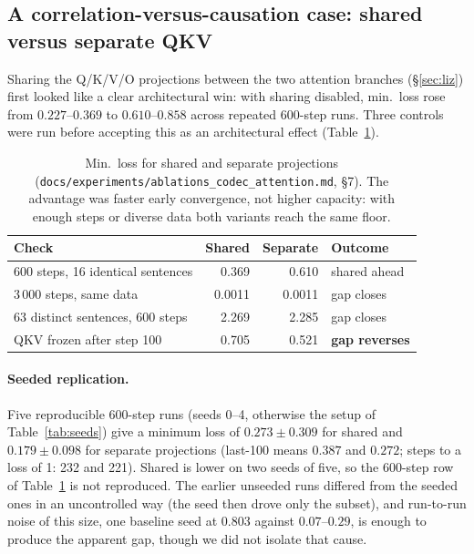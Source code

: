\documentclass[11pt]{article}
\begin{document}
\subsection{A correlation-versus-causation case: shared versus separate QKV}
\label{sec:qkv-sharing}

Sharing the Q/K/V/O projections between the two attention branches
(\S\ref{sec:liz}) first looked like a clear architectural win: with sharing
disabled, min.\ loss rose from $0.227$--$0.369$ to $0.610$--$0.858$ across
repeated 600-step runs. Three controls were run before accepting this as an
architectural effect (Table~\ref{tab:qkv-sharing}).

\begin{table}[t]
\centering
\small
\begin{tabular}{lrrl}
\toprule
Check & Shared & Separate & Outcome \\
\midrule
600 steps, 16 identical sentences & 0.369 & 0.610 & shared ahead \\
3\,000 steps, same data & 0.0011 & 0.0011 & gap closes \\
63 distinct sentences, 600 steps & 2.269 & 2.285 & gap closes \\
QKV frozen after step 100 & 0.705 & 0.521 & \textbf{gap reverses} \\
\bottomrule
\end{tabular}
\caption{Min.\ loss for shared and separate projections
(\nolinkurl{docs/experiments/ablations_codec_attention.md}, \S7).
The advantage was faster early convergence, not higher capacity: with enough
steps or diverse data both variants reach the same floor.}
\label{tab:qkv-sharing}
\end{table}

\paragraph{Seeded replication.} Five reproducible 600-step runs (seeds 0--4, otherwise the setup of
Table~\ref{tab:seeds}) give a minimum loss of $0.273 \pm 0.309$ for shared and $0.179 \pm 0.098$ for separate projections
(last-100 means $0.387$ and $0.272$; steps to a loss of 1: 232 and 221). Shared is lower on two seeds of five, so the
600-step row of Table~\ref{tab:qkv-sharing} is not reproduced. The earlier unseeded runs differed from the seeded ones
in an uncontrolled way (the seed then drove only the subset), and run-to-run noise of this size, one baseline seed at
$0.803$ against $0.07$--$0.29$, is enough to produce the apparent gap, though we did not isolate that cause.
\end{document}
